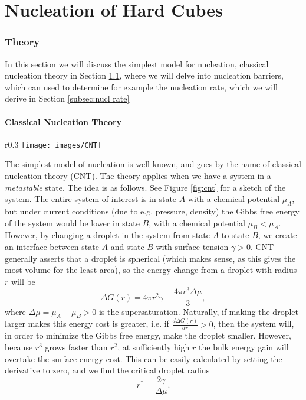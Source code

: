 \documentclass[thesis]{subfiles}
\begin{document}
\part{Nucleation of Hard Cubes}

\section{Theory}

In this section we will discuss the simplest model for nucleation, classical nucleation theory in Section \ref{subsec:cnt}, where we will delve into nucleation barriers, which can used to determine for example the nucleation rate, which we will derive in Section \ref{subsec:nucl rate}

\subsection{Classical Nucleation Theory}\label{subsec:cnt}

\begin{wrapfigure}{r}{0.3\textwidth}
	\centering
	\vspace{-10pt}
	\texttt{[image: images/CNT]}
	\caption{A cartoon of the system described by CNT.}\label{fig:cnt}
	\vspace{-10pt}
\end{wrapfigure}

The simplest model of nucleation is well known, and goes by the name of classical nucleation theory (CNT). The theory applies when we have a system in a \emph{metastable} state. The idea is as follows. See Figure \ref{fig:cnt} for a sketch of the system. The entire system of interest is in state $A$ with a chemical potential $\mu_A$, but under current conditions (due to e.g. pressure, density) the Gibbs free energy of the system would be lower in state $B$, with a chemical potential $\mu_B < \mu_A$. However, by changing a droplet in the system from state $A$ to state $B$, we create an interface between state $A$ and state $B$ with surface tension $\gamma > 0$. CNT generally asserts that a droplet is spherical (which makes sense, as this gives the most volume for the least area), so the energy change from a droplet with radius $r$ will be	
\begin{equation}
	\Delta G(r) = 4\pi r^2 \gamma - \frac{4\pi r^3 \Delta\mu}{3},
\end{equation}
where $\Delta\mu = \mu_A - \mu_B > 0$ is the supersaturation. Naturally, if making the droplet larger makes this energy cost is greater, i.e. if $\frac{d\Delta G(r)}{dr} > 0$, %
then the system will, in order to minimize the Gibbs free energy, make the droplet smaller. However, because $r^3$ grows faster than $r^2$, at sufficiently high $r$ the bulk energy gain will overtake the surface energy cost. This can be easily calculated by setting the derivative to zero, and we find the critical droplet radius
\begin{equation}
	r^* = \frac{2\gamma}{\Delta\mu}.
\end{equation}
\end{document}
